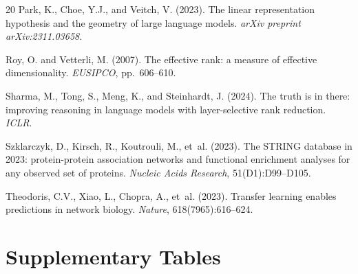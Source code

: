 \documentclass[10pt,twocolumn]{article}
\begin{document}
\begin{thebibliography}{20}
Park, K., Choe, Y.J., and Veitch, V. (2023).
The linear representation hypothesis and the geometry of large language models.
\textit{arXiv preprint arXiv:2311.03658}.

Roy, O. and Vetterli, M. (2007).
The effective rank: a measure of effective dimensionality.
\textit{EUSIPCO}, pp.\ 606--610.

Sharma, M., Tong, S., Meng, K., and Steinhardt, J. (2024).
The truth is in there: improving reasoning in language models with layer-selective rank reduction.
\textit{ICLR}.

Szklarczyk, D., Kirsch, R., Koutrouli, M., et~al. (2023).
The STRING database in 2023: protein-protein association networks and functional enrichment analyses for any observed set of proteins.
\textit{Nucleic Acids Research}, 51(D1):D99--D105.

Theodoris, C.V., Xiao, L., Chopra, A., et~al. (2023).
Transfer learning enables predictions in network biology.
\textit{Nature}, 618(7965):616--624.

\end{thebibliography}

\clearpage
\onecolumn
\appendix
\section*{Supplementary Tables}

\setcounter{table}{0}
\renewcommand{\thetable}{S\arabic{table}}
\end{document}
